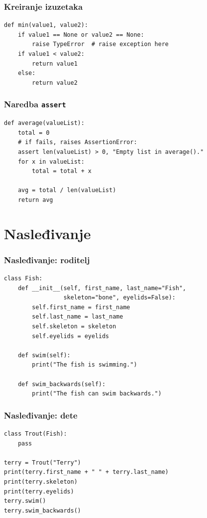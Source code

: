 \documentclass[compress]{beamer}
\begin{document}
\begin{frame}[fragile]
\frametitle{Kreiranje izuzetaka}
\begin{verbatim}
def min(value1, value2):
    if value1 == None or value2 == None:
        raise TypeError  # raise exception here
    if value1 < value2:
        return value1
    else:
        return value2
\end{verbatim}
\end{frame}

\begin{frame}[fragile]
\frametitle{Naredba \texttt{assert}}
\begin{verbatim}
def average(valueList):
    total = 0
    # if fails, raises AssertionError:
    assert len(valueList) > 0, "Empty list in average()."
    for x in valueList:
        total = total + x

    avg = total / len(valueList)
    return avg
\end{verbatim}
\end{frame}

\section[Nasl]{Nasleđivanje}

\begin{frame}[fragile]
\frametitle{Nasleđivanje: roditelj}
\begin{verbatim}
class Fish:
    def __init__(self, first_name, last_name="Fish",
                 skeleton="bone", eyelids=False):
        self.first_name = first_name
        self.last_name = last_name
        self.skeleton = skeleton
        self.eyelids = eyelids

    def swim(self):
        print("The fish is swimming.")

    def swim_backwards(self):
        print("The fish can swim backwards.")
\end{verbatim}
\end{frame}

\begin{frame}[fragile]
\frametitle{Nasleđivanje: dete}
\begin{verbatim}
class Trout(Fish):
    pass

terry = Trout("Terry")
print(terry.first_name + " " + terry.last_name)
print(terry.skeleton)
print(terry.eyelids)
terry.swim()
terry.swim_backwards()
\end{verbatim}
\end{frame}
\end{document}
